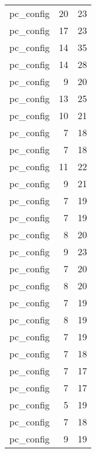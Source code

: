 \begin{table}
\begin{tabular}{lrr}
                       pc\_config &        20 &        23 \\
                       pc\_config &        17 &        23 \\
                       pc\_config &        14 &        35 \\
                       pc\_config &        14 &        28 \\
                       pc\_config &         9 &        20 \\
                       pc\_config &        13 &        25 \\
                       pc\_config &        10 &        21 \\
                       pc\_config &         7 &        18 \\
                       pc\_config &         7 &        18 \\
                       pc\_config &        11 &        22 \\
                       pc\_config &         9 &        21 \\
                       pc\_config &         7 &        19 \\
                       pc\_config &         7 &        19 \\
                       pc\_config &         8 &        20 \\
                       pc\_config &         9 &        23 \\
                       pc\_config &         7 &        20 \\
                       pc\_config &         8 &        20 \\
                       pc\_config &         7 &        19 \\
                       pc\_config &         8 &        19 \\
                       pc\_config &         7 &        19 \\
                       pc\_config &         7 &        18 \\
                       pc\_config &         7 &        17 \\
                       pc\_config &         7 &        17 \\
                       pc\_config &         5 &        19 \\
                       pc\_config &         7 &        18 \\
                       pc\_config &         9 &        19 \\

\end{tabular}
\end{table}
